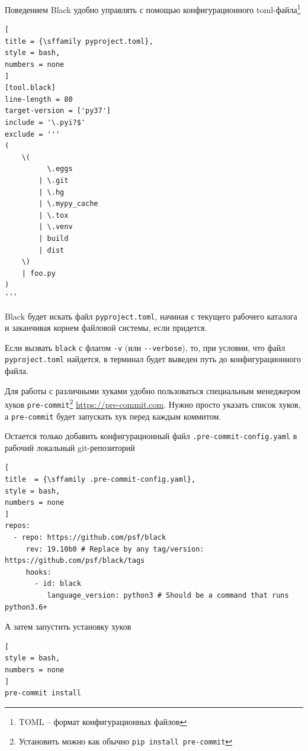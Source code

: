\documentclass[%
	11pt,
	a4paper,
	utf8,
		]{article}
\begin{document}
Поведением Black удобно управлять с помощью конфигурационного toml-файла\footnote{TOML -- формат конфигурационных файлов}
\begin{lstlisting}[
title = {\sffamily pyproject.toml},
style = bash,
numbers = none	
]
[tool.black]
line-length = 80
target-version = ['py37']
include = '\.pyi?$'
exclude = '''
(
    \(
          \.eggs
        | \.git 
        | \.hg
        | \.mypy_cache
        | \.tox
        | \.venv
        | build
        | dist
    \)
    | foo.py
)
'''
\end{lstlisting}

Black будет искать файл \texttt{pyproject.toml}, начиная с текущего рабочего каталога и заканчивая корнем файловой системы, если придется.

Если вызвать \texttt{black} с флагом \verb|-v| (или \verb|--verbose|), то, при условии, что файл \texttt{pyproject.toml} найдется, в терминал будет выведен путь до конфигурационного файла.

Для работы с различными хуками удобно пользоваться специальным менеджером хуков \texttt{pre-commit}\footnote{Установить можно как обычно \texttt{pip install pre-commit}} \url{https://pre-commit.com}. Нужно просто указать список хуков, а \texttt{pre-commit} будет запускать хук перед каждым коммитом.

Остается только добавить конфигурационный файл \texttt{.pre-commit-config.yaml} в рабочий локальный git-репозиторий
\begin{lstlisting}[
title  = {\sffamily .pre-commit-config.yaml},
style = bash,
numbers = none	
]
repos:
  - repo: https://github.com/psf/black
     rev: 19.10b0 # Replace by any tag/version: https://github.com/psf/black/tags
     hooks:
       - id: black
          language_version: python3 # Should be a command that runs python3.6+
\end{lstlisting}

А затем запустить установку хуков
\begin{lstlisting}[
style = bash,
numbers = none	
]
pre-commit install
\end{lstlisting}
\end{document}
